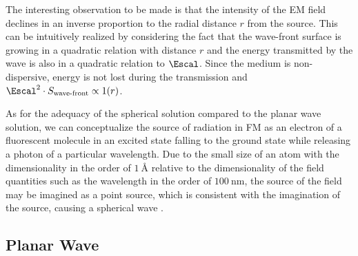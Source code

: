The interesting observation to be made is that the intensity of the \ac{EM} field declines in an inverse proportion to
    the radial distance \(r\) from the source.
This can be intuitively realized by considering the fact that the wave-front surface is growing in a quadratic relation 
    with distance \(r\) and the energy transmitted by the wave is also in a quadratic relation to \(\Escal\).
Since the medium is non-dispersive, energy is not lost during the transmission and \(\Escal^2 \cdot S_{\text{wave-front}}
    \propto 1(r)\).

As for the adequacy of the spherical solution compared to the planar wave solution, we can conceptualize the source of
    radiation in \ac{FM} as an electron of a fluorescent molecule in an excited state falling to the ground state while
    releasing a photon of a particular wavelength.
Due to the small size of an atom with the dimensionality in the order of \(\qty{1}{\angstrom}\) relative to the
    dimensionality of the field quantities such as the wavelength in the order of \(\qty{100}{\nano\meter}\), the source
    of the field may be imagined as a point source, which is consistent with the imagination of the source, causing
    a spherical wave .


\subsection{Planar Wave}

